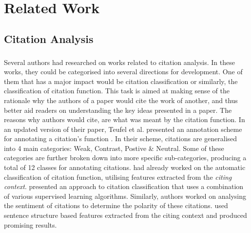 \chapter{Related Work}
\label{Related Works}
\section{Citation Analysis}
\paragraph{}
Several authors had researched on works related to citation analysis. In these works, they could be categorised into several directions for development. One of them that has a major impact would be citation classification or similarly, the classification of citation function. This task is aimed at making sense of the rationale why the authors of a paper would cite the work of another, and thus better aid readers on understanding the key ideas presented in a paper. The reasons why authors would cite, are what was meant by the citation function. In an updated version of their paper, Teufel et al. presented an annotation scheme for annotating a citation's function \cite{teufel2009annotation}. In their scheme, citations are generalised into 4 main categories: Weak, Contrast, Postive \& Neutral. Some of these categories are further broken down into more specific sub-categories, producing a total of 12 classes for annotating citations. \cite{teufel2006automatic} had already worked on the automatic classification of citation function, utilising features extracted from the \textit{citing context}. \cite{dongensemble} presented an approach to citation classification that uses a combination of various supervised learning algorithms. Similarly, authors worked on analysing the sentiment of citations to determine the polarity of these citations. \cite{athar2011sentiment} used sentence structure based features extracted from the citing context and produced promising results.

